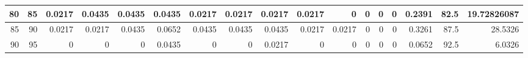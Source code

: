 \begin{table}[ht]
\begin{adjustbox}{width = \textwidth, center}
\begin{tabular}{|rr|r|r|r|r|r|r|r|r|r|r|r|r|r|r|r|}
            \cellcolor[HTML]{C8E4BE}80             & \cellcolor[HTML]{D9EAD3}85             & \cellcolor[HTML]{C7E9D8}0.0217                 & \cellcolor[HTML]{8FD2B1}0.0435                 & \cellcolor[HTML]{8FD2B1}0.0435                 & \cellcolor[HTML]{8FD2B1}0.0435                 & \cellcolor[HTML]{C7E9D8}0.0217                 & \cellcolor[HTML]{C7E9D8}0.0217                 & \cellcolor[HTML]{C7E9D8}0.0217                 & \cellcolor[HTML]{C7E9D8}0.0217                  & \cellcolor[HTML]{FFFFFF}0                       & \cellcolor[HTML]{FFFFFF}0                       & \cellcolor[HTML]{FFFFFF}0                       & \cellcolor[HTML]{FFFFFF}0                       & \cellcolor[HTML]{D9D2E9}0.2391                                                  & \cellcolor[HTML]{D9D2E9}82.5                                            & \cellcolor[HTML]{D9D2E9}19.72826087                                                              \\ \hline
            \cellcolor[HTML]{C8E4BE}85             & \cellcolor[HTML]{D9EAD3}90             & \cellcolor[HTML]{C7E9D8}0.0217                 & \cellcolor[HTML]{C7E9D8}0.0217                 & \cellcolor[HTML]{8FD2B1}0.0435                 & \cellcolor[HTML]{57BB8A}0.0652                 & \cellcolor[HTML]{8FD2B1}0.0435                 & \cellcolor[HTML]{8FD2B1}0.0435                 & \cellcolor[HTML]{8FD2B1}0.0435                 & \cellcolor[HTML]{C7E9D8}0.0217                  & \cellcolor[HTML]{C7E9D8}0.0217                  & \cellcolor[HTML]{FFFFFF}0                       & \cellcolor[HTML]{FFFFFF}0                       & \cellcolor[HTML]{FFFFFF}0                       & \cellcolor[HTML]{D9D2E9}0.3261                                                  & \cellcolor[HTML]{D9D2E9}87.5                                            & \cellcolor[HTML]{D9D2E9}28.5326                                                                  \\ \hline
            \rowcolor[HTML]{FFFFFF} 
            \cellcolor[HTML]{C8E4BE}90             & \cellcolor[HTML]{D9EAD3}95             & 0                                              & 0                                              & 0                                              & \cellcolor[HTML]{8FD2B1}0.0435                 & 0                                              & 0                                              & \cellcolor[HTML]{C7E9D8}0.0217                 & 0                                               & 0                                               & 0                                               & 0                                               & 0                                               & \cellcolor[HTML]{D9D2E9}0.0652                                                  & \cellcolor[HTML]{D9D2E9}92.5                                            & \cellcolor[HTML]{D9D2E9}6.0326                                                                   \\ \hline

\end{tabular}
\end{adjustbox}
\end{table}
